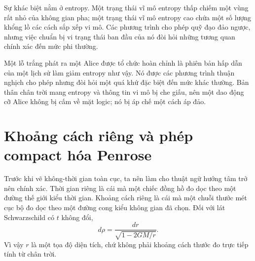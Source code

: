 Sự khác biệt nằm ở entropy. Một trạng thái vĩ mô entropy thấp chiếm một vùng rất nhỏ của không gian pha; một trạng thái vĩ mô entropy cao chứa một số lượng khổng lồ các cách sắp xếp vi mô. Các phương trình cho phép quỹ đạo đảo ngược, nhưng việc chuẩn bị vi trạng thái ban đầu của nó đòi hỏi những tương quan chính xác đến mức phi thường.

\begin{classroomqa}
\end{classroomqa}

Một lỗ trắng phát ra một Alice được tổ chức hoàn chỉnh là phiên bản hấp dẫn của một lịch sử làm giảm entropy như vậy. Nó được các phương trình thuận nghịch cho phép nhưng đòi hỏi một quá khứ đặc biệt đến mức khác thường. Bản thân chân trời mang entropy và thông tin vi mô bị che giấu, nên một dao động cỡ Alice không bị cấm về mặt logic; nó bị áp chế một cách áp đảo.

\begin{classroomqa}
\end{classroomqa}

\section{Khoảng cách riêng và phép compact hóa Penrose}

Trước khi vẽ không-thời gian toàn cục, ta nên làm cho thuật ngữ hướng tâm trở nên chính xác. Thời gian riêng là cái mà một chiếc đồng hồ đo dọc theo một đường thế giới kiểu thời gian. Khoảng cách riêng là cái mà một chuỗi thước mét cục bộ đo dọc theo một đường cong kiểu không gian đã chọn. Đối với lát Schwarzschild có \(t\) không đổi,
\begin{equation}
d\rho=\frac{dr}{\sqrt{1-2GM/r}}.
\label{eq:l04-proper-distance}
\end{equation}
Vì vậy \(r\) là một tọa độ diện tích, chứ không phải khoảng cách thước đo trực tiếp tính từ chân trời.

